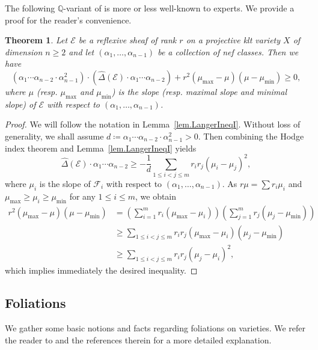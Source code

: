 \documentclass[12pt,twoside]{amsart}
\newtheorem{thm}{Theorem}[section]
\theoremstyle{definition}
\begin{document}
The following $\mathbb{Q}$-variant of \cite[Theorem~5.1]{Langer2004} is more or less well-known to experts. We provide a proof for the reader's convenience.

\begin{thm}
	\label{thm.LangerIneqII}
	Let $\mathcal{E}$ be a reflexive sheaf of rank $r$ on a projective klt variety $X$ of dimension $n\geq 2$ and let $(\alpha_1,\dots,\alpha_{n-1})$ be a collection of nef classes. Then we have
	\[
	(\alpha_1\cdots \alpha_{n-2} \cdot \alpha_{n-1}^2) \cdot(\hat{\Delta}(\mathcal{E})\cdot \alpha_1\cdots\alpha_{n-2}) + r^2 (\mu_{\max} - \mu) (\mu-\mu_{\min}) \geq 0,
	\]
	where $\mu$ (resp. $\mu_{\max}$ and $\mu_{\min}$) is the slope (resp. maximal slope and minimal slope) of $\mathcal{E}$ with respect to $(\alpha_1,\dots,\alpha_{n-1})$.
\end{thm}

\begin{proof}
	We will follow the notation in Lemma~\ref{lem.LangerIneqI}. Without loss of generality, we shall assume $d\coloneqq \alpha_1\cdots \alpha_{n-2}\cdot \alpha_{n-1}^2>0$. Then combining the Hodge index theorem and Lemma~\ref{lem.LangerIneqI} yields
	\[
		\hat{\Delta}(\mathcal{E})\cdot \alpha_1\cdots\alpha_{n-2} 
		 \geq - \frac{1}{d} \sum_{1\leq i<j\leq m} r_i r_j (\mu_i-\mu_j)^2,
	\]
	where $\mu_i$ is the slope of $\mathcal{F}_i$ with respect to $(\alpha_1,\dots,\alpha_{n-1})$. As $r\mu=\sum r_i\mu_i$ and $\mu_{\max}\geq \mu_i\geq \mu_{\min}$ for any $1\leq i\leq m$, we obtain
	\begin{align*}
		r^2(\mu_{\max}-\mu) (\mu-\mu_{\min})
		 & = \left(\sum_{i=1}^{m} r_i (\mu_{\max} - \mu_i)\right) \left(\sum_{j=1}^{m} r_j(\mu_j - \mu_{\min})\right) \\
		 & \geq \sum_{1\leq i < j\leq m} r_i r_j (\mu_{\max}-\mu_i) (\mu_j-\mu_{\min}) \\
		 & \geq \sum_{1\leq i<j\leq m} r_i r_j (\mu_j - \mu_i)^2,
	\end{align*}
	which implies immediately the desired inequality.
\end{proof}

\subsection{Foliations}

We gather some basic notions and facts regarding foliations on varieties. We refer the reader to \cite[\S\,3]{Druel2021} and the references therein for a more detailed explanation. 
\end{document}
